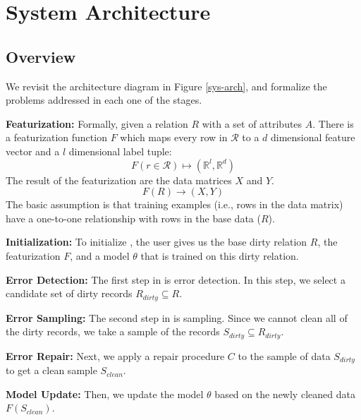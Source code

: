 \section{System Architecture}\label{arch}

\subsection{Overview}
We revisit the architecture diagram in Figure \ref{sys-arch}, and formalize
the problems addressed in each one of the stages.

\vspace{0.5em}

\textbf{Featurization: } Formally, given a relation $R$ with a set of attributes $A$.
There is a featurization function $F$ which maps every row in $\mathcal{R}$ to a $d$ dimensional feature vector and a $l$ dimensional label tuple: 
\[F(r \in \mathcal{R}) \mapsto (\mathbb{R}^l, \mathbb{R}^d)\]
The result of the featurization are the data matrices $X$ and $Y$.
\[
F(R)\rightarrow (X,Y)
\]
The basic assumption is that training examples (i.e., rows in the data matrix) have a one-to-one relationship with rows in the base data ($R$).

\vspace{0.5em}

\noindent\textbf{Initialization: } To initialize \sys, the user gives us the base dirty relation $R$, the featurization $F$, and a model $\theta$ that is trained on this dirty relation.

\vspace{0.5em}

\noindent\textbf{Error Detection: } The first step in \sys is error detection. In this step, we select a candidate set of dirty records $R_{dirty} \subseteq R$. 

\vspace{0.5em}

\noindent\textbf{Error Sampling: } The second step in \sys is sampling. Since we cannot clean all of the dirty records, we take a sample of the records $S_{dirty} \subseteq R_{dirty}$.

\vspace{0.5em}

\noindent\textbf{Error Repair: } Next, we apply a repair procedure $C$ to the sample of data $S_{dirty}$ to get a clean sample $S_{clean}$.

\vspace{0.5em}

\noindent\textbf{Model Update: } Then, we update the model $\theta$ based on the newly cleaned data $F(S_{clean})$.

